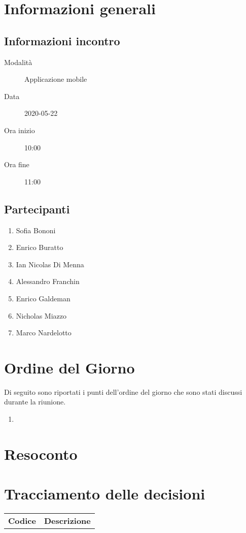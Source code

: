 \documentclass{article}
\begin{document}


\section{Informazioni generali}%
\label{sec:informazioni_generali}

\subsection{Informazioni incontro}%
\label{sub:informazioni_incontro}

\begin{description}
  \item[Modalità] Applicazione mobile 
  \item[Data] 2020-05-22
  \item[Ora inizio] 10:00
  \item[Ora fine] 11:00
\end{description}

\subsection{Partecipanti}%
\label{sub:partecipanti}

\begin{enumerate}
  \item Sofia Bononi
  \item Enrico Buratto
  \item Ian Nicolas Di Menna
  \item Alessandro Franchin
  \item Enrico Galdeman
  \item Nicholas Miazzo
  \item Marco Nardelotto
\end{enumerate}

\section{Ordine del Giorno}%
\label{ordine_del_giorno}
Di seguito sono riportati i punti dell'ordine del giorno che sono stati discussi durante la riunione.
\begin{enumerate}
  \item 
\end{enumerate}

\section{Resoconto}%
\label{resoconto}
\paragraph*{}

\section{Tracciamento delle decisioni}
\begin{table}[H]
  \centering
  \begin{tabular}{p{4cm}|p{12cm}}
    \rowcolor{lightgray}
    \textbf{Codice}  & \textbf{Descrizione}      \\
  \end{tabular}
\end{table}
\end{document}
